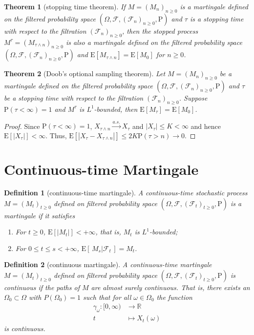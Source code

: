 \documentclass{report}
\newtheorem{definition}{Definition}[section]
\newtheorem{theorem}{Theorem}[section]
\theoremstyle{nonumberplain}
\newtheorem{proof}{Proof.}
\begin{document}
\begin{theorem}[stopping time theorem]
If $M=(M_{n})_{n\ge0}$ is a martingale defined on the filtered probability space $(\Omega,\mathcal{F},(\mathcal{F}_{n})_{n\ge0},\mathrm{P})$ and $\tau$ is a stopping time with respect to the filtration $(\mathcal{F}_{n})_{n\ge 0}$, then the stopped process $M^\tau=(M_{\tau\wedge{n}})_{n\ge0}$ is also a martingale defined on the filtered probability space $(\Omega,\mathcal{F},(\mathcal{F}_{n})_{n\ge0},\mathrm{P})$ and $\mathrm{E}[M_{\tau\wedge{n}}]=\mathrm{E}[M_0]$ for $n\ge0$.
\end{theorem}

\begin{theorem}[Doob's optional sampling theorem]
Let $M=(M_{n})_{n\ge0}$ be a martingale defined on the filtered probability space $(\Omega,\mathcal{F},(\mathcal{F}_{n})_{n\ge0},\mathrm{P})$ and $\tau$ be a stopping time with respect to the filtration $(\mathcal{F}_{n})_{n\ge 0}$. Suppose $\mathrm{P}(\tau<\infty)=1$ and $M^\tau$ is $L^1$-bounded, then $\mathrm{E}[M_\tau]=\mathrm{E}[M_{0}]$.
\end{theorem}
\begin{proof}	
Since $\mathrm{P}(\tau<\infty)=1$, $X_{\tau \wedge n} \stackrel{a.s.}{\longrightarrow}X_{\tau}$ and $\left|X_{\tau}\right| \leq K<\infty$ and hence $\mathrm{E}\left[\left|X_{\tau}\right|\right]<\infty .$ Thus, $\mathrm{E}\left[\left|X_{\tau}-X_{\tau \wedge n}\right| \right]\leq 2 K \mathrm{P}(\tau>n) \rightarrow 0$.
\end{proof}

\section{Continuous-time Martingale}
\begin{definition}[continuous-time martingale]
	A continuous-time stochastic process $M=(M_t)_{t\ge 0}$ defined on filtered probability space $(\Omega,\mathcal{F},(\mathcal{F}_{t})_{t\ge0},\mathrm{P})$ is a \emph{martingale} if it satisfies
	\begin{enumerate}
		\item For $t\ge0$, $\mathrm{E}[|M_t|]<+\infty$, that is, $M_t$ is $L^1$-bounded;
		\item For $0\le t\le s<+\infty$, $\mathrm{E}[\,M_{s}|\mathcal{F}_t\,]=M_t$.
	\end{enumerate}
\end{definition}
\begin{definition}[continuous martingale]
	A continuous-time martingale $M=(M_t)_{t\ge 0}$ defined on filtered probability space $(\Omega,\mathcal{F},(\mathcal{F}_{t})_{t\ge0},\mathrm{P})$ is continuous if the paths of $M$ are almost surely continuous. That is, there exists an $\Omega_{0} \subset \Omega$ with $P\left(\Omega_{0}\right)=1$ such that for all $\omega \in \Omega_{0}$ the function
	\begin{align*}
	\gamma_\omega:[0, \infty)&\longrightarrow\mathbb{R}\\
	t&\longmapsto X_{t}(\omega)
	\end{align*}
	is continuous.
\end{definition}
\end{document}
